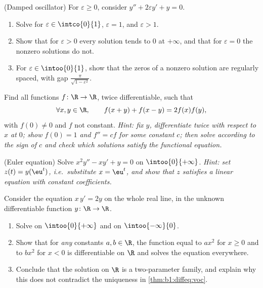 \begin{exercise}[$\star\star\star$]\label{exo:b1:diffeq:9}
(Damped oscillator) For $\varepsilon \geq 0$, consider
$y'' + 2\varepsilon y' + y = 0$.
\begin{enumerate}
  \item Solve for $\varepsilon \in \intco{0}{1}$, $\varepsilon = 1$,
        and $\varepsilon > 1$.
  \item Show that for $\varepsilon > 0$ every solution tends to $0$
        at $+\infty$, and that for $\varepsilon = 0$ the nonzero
        solutions do not.
  \item For $\varepsilon \in \intoo{0}{1}$, show that the zeros of a
        nonzero solution are regularly spaced, with gap
        $\frac{\pi}{\sqrt{1 - \varepsilon^2}}$.
\end{enumerate}
\end{exercise}

\begin{exercise}[$\star\star\star$]\label{exo:b1:diffeq:10}
Find all functions $f \colon \R \to \R$, twice differentiable, such
that
\[
\forall x, y \in \R, \qquad f(x + y) + f(x - y) = 2 f(x) f(y),
\]
with $f(0) \ne 0$ and $f$ not constant.
\emph{Hint: fix $y$, differentiate twice with respect to $x$ at $0$;
show $f(0) = 1$ and $f'' = c f$ for some constant $c$; then solve
according to the sign of $c$ and check which solutions satisfy the
functional equation.}
\end{exercise}

\begin{exercise}[$\star\star$]\label{exo:b1:diffeq:11}
(Euler equation) Solve $x^2 y'' - x y' + y = 0$ on
$\intoo{0}{+\infty}$. \emph{Hint: set $z(t) = y(\eu^t)$, i.e.\
substitute $x = \eu^t$, and show that $z$ satisfies a linear
equation with constant coefficients.}
\end{exercise}

\begin{exercise}[$\star\star\star$]\label{exo:b1:diffeq:12}
Consider the equation $x\,y' = 2y$ on the whole real line, in the
unknown differentiable function $y \colon \R \to \R$.
\begin{enumerate}
  \item Solve on $\intoo{0}{+\infty}$ and on $\intoo{-\infty}{0}$.
  \item Show that for \emph{any} constants $a, b \in \R$, the
        function equal to $ax^2$ for $x \geq 0$ and to $bx^2$ for
        $x < 0$ is differentiable on $\R$ and solves the equation
        everywhere.
  \item Conclude that the solution  on $\R$ is a two-parameter
        family, and explain why this does not contradict the
        uniqueness in \cref{thm:b1:diffeq:voc}.
\end{enumerate}
\end{exercise}

